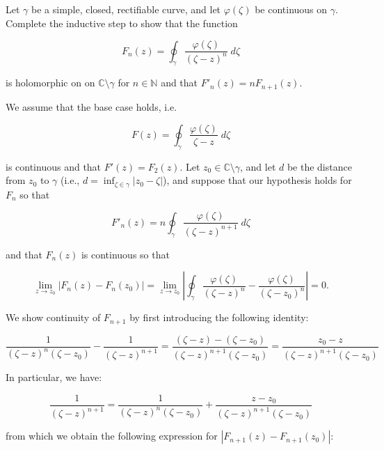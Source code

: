 Let $\gamma$ be a simple, closed, rectifiable curve, and let $\varphi(\zeta)$ be continuous on $\gamma$. Complete the 
inductive step to show that the function

$$
F_n(z) = \oint_{\gamma} {\frac{\varphi(\zeta)}{(\zeta - z)^{n}} \; d\zeta}
$$

is holomorphic on on $\mathbb{C} \setminus \gamma$ for $n \in \mathbb{N}$ and that $F'_n(z) = n F_{n+1}(z)$.

\begin{solution}
    We assume that the base case holds, i.e.

    $$
    F(z) = \oint_{\gamma} {\frac{\varphi(\zeta)}{\zeta - z} \; d\zeta}
    $$
    
    is continuous and that $F'(z) = F_2(z)$. Let $z_0 \in \mathbb{C} \setminus \gamma$, and let $d$ be the distance from
    $z_0$ to $\gamma$ (i.e., $d = \inf_{\zeta \in \gamma}|z_0 - \zeta|$), and suppose that our hypothesis holds for 
    $F_n$ so that
    
    $$
    F'_n(z) = n \oint_{\gamma} {\frac{\varphi(\zeta)}{(\zeta - z)^{n+1}} \; d\zeta}
    $$

    and that $F_n(z)$ is continuous so that 

    $$
    \lim\limits_{z \to z_0} \left|F_n(z) - F_n(z_0)\right|
      = \lim\limits_{z \to z_0} \left|\oint_{\gamma} {\frac{\varphi(\zeta)}{(\zeta - z)^n} -\frac{\varphi(\zeta)}{(\zeta - z_0)^n} } \right|
      = 0.
    $$

    We show continuity of $F_{n+1}$ by first introducing the following identity:

    $$
    \frac{1}{(\zeta - z)^n (\zeta - z_0)} - \frac{1}{(\zeta - z)^{n+1}} 
      = \frac{(\zeta - z) - (\zeta - z_0)}{(\zeta - z)^{n+1} (\zeta - z_0)}
      = \frac{z_0 - z}{(\zeta - z)^{n+1} (\zeta - z_0)}
    $$

    In particular, we have:

    $$
    \frac{1}{(\zeta - z)^{n+1}} = \frac{1}{(\zeta - z)^n (\zeta - z_0)} + \frac{z - z_0}{(\zeta - z)^{n+1} (\zeta - z_0)}
    $$
   
    from which we obtain the following expression for $\left|F_{n+1}(z) - F_{n+1}(z_0)\right|$:


\end{solution}
